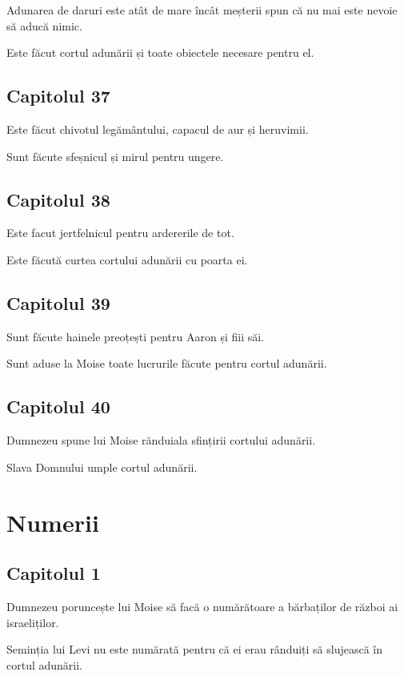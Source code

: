 \documentclass[12pt,a4paper]{article}
\begin{document}
Adunarea de daruri este atât de mare încât meșterii spun că nu mai este nevoie să aducă nimic.

Este făcut cortul adunării și toate obiectele necesare pentru el.

\subsection{Capitolul 37}

Este făcut chivotul legământului, capacul de aur și heruvimii.

Sunt făcute sfeșnicul și mirul pentru ungere.

\subsection{Capitolul 38}

Este facut jertfelnicul pentru ardererile de tot.

Este făcută curtea cortului adunării cu poarta ei.

\subsection{Capitolul 39}

Sunt făcute hainele preoțești pentru Aaron și fiii săi.

Sunt aduse la Moise toate lucrurile făcute pentru cortul adunării.

\subsection{Capitolul 40}

Dumnezeu spune lui Moise rănduiala sfințirii cortului adunării.

Slava Domnului umple cortul adunării.

\section{Numerii}

\subsection{Capitolul 1}

Dumnezeu poruncește lui Moise să facă o numărătoare a bărbaților de război ai israeliților.

Seminția lui Levi nu este numărată pentru că ei erau rânduiți să slujească în cortul adunării.
\end{document}
